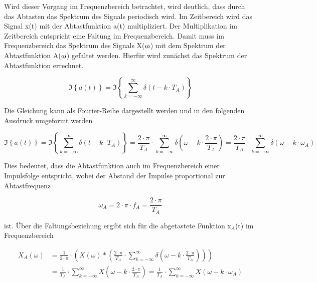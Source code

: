 \noindent Wird dieser Vorgang im Frequenzbereich betrachtet, wird deutlich, dass durch das Abtasten das Spektrum des Signals periodisch wird. Im Zeitbereich wird das Signal x(t) mit der Abtastfunktion a(t) multipliziert. Der Multiplikation im Zeitbereich entspricht eine Faltung im Frequenzbereich. Damit muss im Frequenzbereich das Spektrum des Signals X($\omegaup$) mit dem Spektrum der Abtastfunktion A($\omegaup$) gefaltet werden. Hierfür wird zunächst das Spektrum der Abtastfunktion errechnet.

\begin{equation}\label{eq:twoeight}
\Im \left\{a\left(t\right)\right\}=\Im \left\{\sum _{k=-\infty }^{\infty }\delta \left(t-k\cdot T_{A} \right) \right\}
\end{equation}

\noindent Die Gleichung kann als Fourier-Reihe dargestellt werden und in den folgenden Ausdruck umgeformt werden

\begin{equation}\label{eq:twonine}
\Im \left\{a\left(t\right)\right\}=\Im \left\{\sum _{k=-\infty }^{\infty }\delta \left(t-k\cdot T_{A} \right) \right\}=\frac{2\cdot \pi }{T_{A} } \cdot \sum _{k=-\infty }^{\infty }\delta \left(\omega -k\cdot \frac{2\cdot \pi }{T_{A} } \right) =\frac{2\cdot \pi }{T_{A} } \cdot \sum _{k=-\infty }^{\infty }\delta \left(\omega -k\cdot \omega _{A} \right) 
\end{equation}

\noindent Dies bedeutet, dass die Abtastfunktion auch im Frequenzbereich einer Impulsfolge entspricht, wobei der Abstand der Impulse proportional zur Abtastfrequenz

\begin{equation}\label{eq:twoten}
\omega _{A} =2\cdot \pi \cdot f_{A} =\frac{2\cdot \pi }{T_{A} }
\end{equation}

\noindent ist. Über die Faltungsbeziehung ergibt sich für die abgetastete Funktion x$_{A}$(t) im Frequenzbereich 

\begin{equation}\label{eq:twoeleven}
\begin{split}
X_{A} \left(\omega \right) & = \frac{1}{2\cdot \pi } \cdot \left(X\left(\omega \right)*\left(\frac{2\cdot \pi }{T_{A} } \cdot \sum _{k=-\infty }^{\infty }\delta \left(\omega -k\cdot \frac{2\cdot \pi }{T_{A} } \right) \right)\right) \\ 
& = \frac{1}{T_{A} } \cdot \sum _{k=-\infty }^{\infty }X\left(\omega -k\cdot \frac{2\cdot \pi }{T_{A} } \right) =\frac{1}{T_{A} } \cdot \sum _{k=-\infty }^{\infty }X\left(\omega -k\cdot \omega _{A} \right)    
\end{split}
\end{equation}

